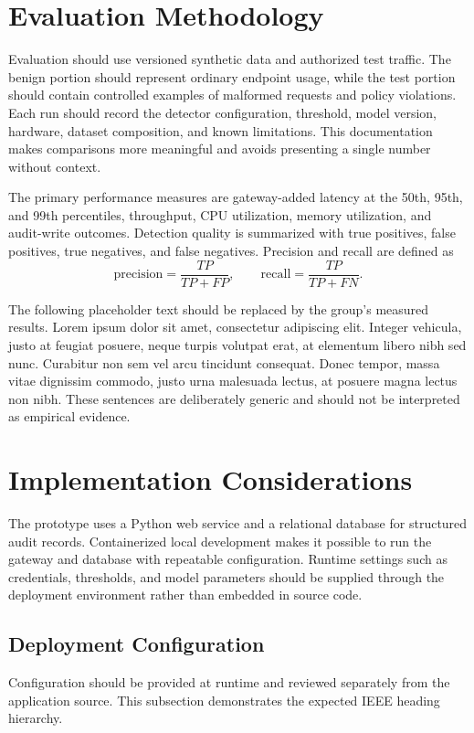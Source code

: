 \documentclass[conference]{IEEEtran}
\begin{document}
\section{Evaluation Methodology}
Evaluation should use versioned synthetic data and authorized test traffic.
The benign portion should represent ordinary endpoint usage, while the test
portion should contain controlled examples of malformed requests and policy
violations. Each run should record the detector configuration, threshold,
model version, hardware, dataset composition, and known limitations. This
documentation makes comparisons more meaningful and avoids presenting a single
number without context.

The primary performance measures are gateway-added latency at the 50th, 95th,
and 99th percentiles, throughput, CPU utilization, memory utilization, and
audit-write outcomes. Detection quality is summarized with true positives,
false positives, true negatives, and false negatives. Precision and recall are
defined as
\begin{equation}
  \text{precision}=\frac{TP}{TP+FP}, \qquad
  \text{recall}=\frac{TP}{TP+FN}.
  \label{eq:quality}
\end{equation}

The following placeholder text should be replaced by the group's measured
results. Lorem ipsum dolor sit amet, consectetur adipiscing elit. Integer
vehicula, justo at feugiat posuere, neque turpis volutpat erat, at elementum
libero nibh sed nunc. Curabitur non sem vel arcu tincidunt consequat. Donec
tempor, massa vitae dignissim commodo, justo urna malesuada lectus, at posuere
magna lectus non nibh. These sentences are deliberately generic and should not
be interpreted as empirical evidence.

\section{Implementation Considerations}
The prototype uses a Python web service and a relational database for
structured audit records. Containerized local development makes it possible to
run the gateway and database with repeatable configuration. Runtime settings
such as credentials, thresholds, and model parameters should be supplied
through the deployment environment rather than embedded in source code.

\subsection{Deployment Configuration}
Configuration should be provided at runtime and reviewed separately from the
application source. This subsection demonstrates the expected IEEE heading
hierarchy.
\end{document}
